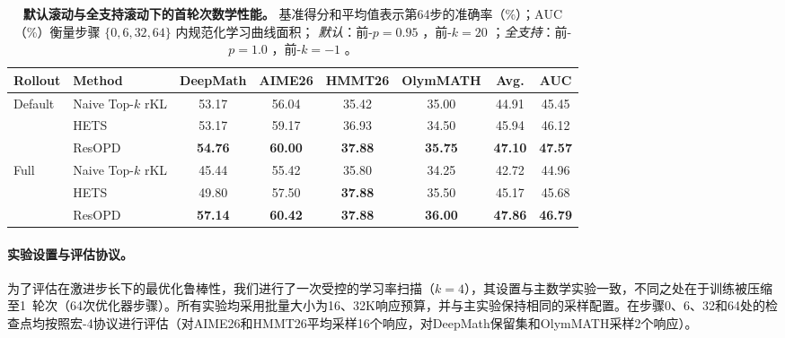 \begin{table}[t]
\centering
\small
\caption{\textbf{默认滚动与全支持滚动下的首轮次数学性能。}
基准得分和平均值表示第64步的准确率（\%）；$\text{AUC}$ （\%）衡量步骤 $\{0, 6, 32, 64\}$ 内规范化学习曲线面积；  
\textit{默认}：前-$p=0.95$ ，前-$k=20$ ；\textit{全支持}：前-$p=1.0$ ，前-$k=-1$ 。}
\vspace{-2mm}
\label{tab:full-support-first-epoch}
\setlength{\tabcolsep}{5pt}
\renewcommand{\arraystretch}{1.15}
\begin{tabular}{llcccccc}
\toprule
\textbf{Rollout} & \textbf{Method} & \textbf{DeepMath} & \textbf{AIME26} & \textbf{HMMT26} & \textbf{OlymMATH} & \textbf{Avg.} & \textbf{AUC} \\
\midrule
\multirow{3}{*}{Default}
& Naive Top-$k$ rKL & 53.17 & 56.04 & 35.42 & 35.00 & 44.91 & 45.45 \\
& HETS              & 53.17 & 59.17 & 36.93 & 34.50 & 45.94 & 46.12 \\
& ResOPD            & \textbf{54.76} & \textbf{60.00} & \textbf{37.88} & \textbf{35.75} & \textbf{47.10} & \textbf{47.57} \\
\midrule
\multirow{3}{*}{Full}
& Naive Top-$k$ rKL & 45.44 & 55.42 & 35.80 & 34.25 & 42.72 & 44.96 \\
& HETS              & 49.80 & 57.50 & \textbf{37.88} & 35.50 & 45.17 & 45.68 \\
& ResOPD            & \textbf{57.14} & \textbf{60.42} & \textbf{37.88} & \textbf{36.00} & \textbf{47.86} & \textbf{46.79} \\
\bottomrule
\end{tabular}
\end{table}

\paragraph{实验设置与评估协议。}
为了评估在激进步长下的最优化鲁棒性，我们进行了一次受控的学习率扫描（$k=4$），其设置与主数学实验一致，不同之处在于训练被压缩至1~轮次（64次优化器步骤）。所有实验均采用批量大小为16、32K响应预算，并与主实验保持相同的采样配置。在步骤0、6、32和64处的检查点均按照宏-4协议进行评估（对AIME26和HMMT26平均采样16个响应，对DeepMath保留集和OlymMATH采样2个响应）。
\vspace{-4mm}

